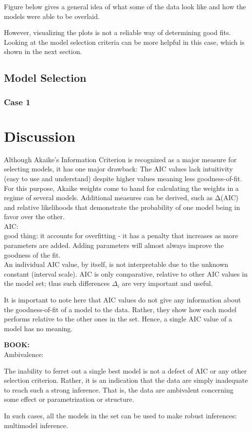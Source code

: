 \documentclass[11pt]{article}
\begin{document}
\begin{linenumbers}
	\par Figure \label{} below gives a general idea of what some of the data look like and how the models were able to be overlaid.
	
	\par However, visualizing the plots is not a reliable way of determining good fits. Looking at the model selection criteria can be more helpful in this case, which is shown in the next section.
	
	\subsection{Model Selection}
	\subsubsection{Case 1}
	
	\section{Discussion}

	Although Akaike's Information Criterion is recognized as a major measure for selecting models, it has one major drawback: The AIC values lack intuitivity (easy to use and understand) despite higher values meaning less goodness-of-fit. For this purpose, Akaike weights come to hand for calculating the weights in a regime of several models. Additional measures can be derived, such as Δ(AIC) and relative likelihoods that demonstrate the probability of one model being in favor over the other.\\
	
	AIC:\\
	good thing: it accounts for overfitting - it has a penalty that increases as more parameters are added. Adding parameters will almost always improve the goodness of the fit.\\
	An individual AIC value, by itself, is not interpretable due to the unknown constant (interval scale). AIC is only comparative, relative to other AIC values in the model set; thus such differences $\Delta_i$ are very important and useful.
	
	It is important to note here that AIC values do not give any information about the goodness-of-fit of a model to the data. Rather, they show how each model performs relative to the other ones in the set. Hence, a single AIC value of a model has no meaning.
	
	\textbf{BOOK:}\\
	Ambivalence:
	\par The inability to ferret out a single best model is not a defect of AIC or any other selection criterion. Rather, it is an indication that the data are simply inadequate to reach such a strong inference. That is, the data are ambivalent concerning some effect or parametrization or structure.
	\par In such cases, all the models in the set can be used to make robust inferences: multimodel inference.\\


\end{linenumbers}
\end{document}
